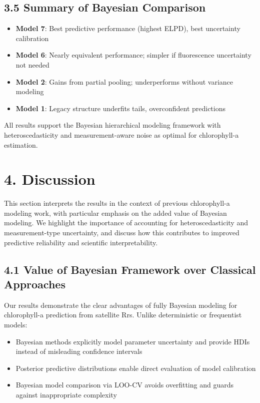 \documentclass[
]{agujournal2019}
\providecommand{\tightlist}{%
  \setlength{\itemsep}{0pt}\setlength{\parskip}{0pt}}\usepackage{longtable,booktabs,array}
\begin{document}
\subsection{3.5 Summary of Bayesian
Comparison}\label{summary-of-bayesian-comparison}

\begin{itemize}
\tightlist
\item
  \textbf{Model 7}: Best predictive performance (highest ELPD), best
  uncertainty calibration
\item
  \textbf{Model 6}: Nearly equivalent performance; simpler if
  fluorescence uncertainty not needed
\item
  \textbf{Model 2}: Gains from partial pooling; underperforms without
  variance modeling
\item
  \textbf{Model 1}: Legacy structure underfits tails, overconfident
  predictions
\end{itemize}

All results support the Bayesian hierarchical modeling framework with
heteroscedasticity and measurement-aware noise as optimal for
chlorophyll-a estimation.

\section{4. Discussion}\label{discussion}

This section interprets the results in the context of previous
chlorophyll-a modeling work, with particular emphasis on the added value
of Bayesian modeling. We highlight the importance of accounting for
heteroscedasticity and measurement-type uncertainty, and discuss how
this contributes to improved predictive reliability and scientific
interpretability.

\subsection{4.1 Value of Bayesian Framework over Classical
Approaches}\label{value-of-bayesian-framework-over-classical-approaches}

Our results demonstrate the clear advantages of fully Bayesian modeling
for chlorophyll-a prediction from satellite Rrs. Unlike deterministic or
frequentist models:

\begin{itemize}
\tightlist
\item
  Bayesian methods explicitly model parameter uncertainty and provide
  HDIs instead of misleading confidence intervals
\item
  Posterior predictive distributions enable direct evaluation of model
  calibration
\item
  Bayesian model comparison via LOO-CV avoids overfitting and guards
  against inappropriate complexity
\end{itemize}
\end{document}
